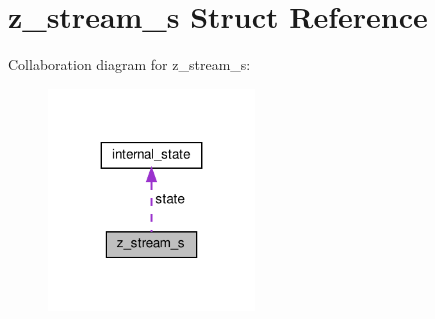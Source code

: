 \hypertarget{structz__stream__s}{}\section{z\+\_\+stream\+\_\+s Struct Reference}
\label{structz__stream__s}


Collaboration diagram for z\+\_\+stream\+\_\+s\+:
\nopagebreak
\begin{figure}[H]
\begin{center}
\leavevmode
\includegraphics[width=155pt]{structz__stream__s__coll__graph}
\end{center}
\end{figure}
